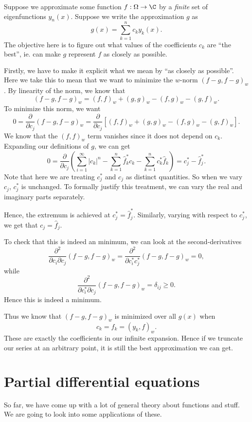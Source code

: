 \documentclass[a4paper]{article}
\begin{document}
Suppose we approximate some function $f: \Omega \to \C$ by a \emph{finite} set of eigenfunctions $y_n(x)$. Suppose we write the approximation $g$ as
\[
  g(x) = \sum_{k = 1}^n c_k y_k(x).
\]
The objective here is to figure out what values of the coefficients $c_k$ are ``the best'', ie. can make $g$ represent $f$ as closely as possible.

Firstly, we have to make it explicit what we mean by ``as closely as possible''. Here we take this to mean that we want to minimize the $w$-norm $(f - g, f - g)_w$. By linearity of the norm, we know that
\[
  (f - g, f - g)_w = (f, f)_w + (g, g)_w - (f, g)_w - (g, f)_w.
\]
To minimize this norm, we want
\[
  0 = \frac{\partial}{\partial c_j} (f - g, f - g)_w = \frac{\partial}{\partial c_j}[(f, f)_w + (g, g)_w - (f, g)_w - (g, f)_w].
\]
We know that the $(f, f)_w$ term vanishes since it does not depend on $c_k$. Expanding our definitions of $g$, we can get
\[
  0 = \frac{\partial}{\partial c_j}\left(\sum_{i = 1}^\infty |c_k|^n - \sum_{k = 1}^n \hat{f}_k^* c_k  - \sum_{k = 1}^n c_k^* \hat{f}_k\right) = c^*_j - \hat{f}_j^*.
\]
Note that here we are treating $c_j^*$ and $c_j$ as distinct quantities. So when we vary $c_j$, $c_j^*$ is unchanged. To formally justify this treatment, we can vary the real and imaginary parts separately.

Hence, the extremum is achieved at $c_j^* = \hat{f}_j^*$. Similarly, varying with respect to $c_j^*$, we get that $c_j = \hat{f}_j$.

To check that this is indeed an minimum, we can look at the second-derivatives
\[
  \frac{\partial^2}{\partial c_i \partial c_j} (f - g, f - g)_w = \frac{\partial^2}{\partial c_i^* c_j^*} (f - g, f - g)_w = 0,
\]
while
\[
  \frac{\partial^2}{\partial c_i^* \partial c_j} (f - g, f - g)_w = \delta_{ij} \geq 0.
\]
Hence this is indeed a minimum.

Thus we know that $(f - g, f - g)_w$ is minimized over all $g(x)$ when
\[
  c_k = \hat{f}_k = (y_k, f)_w.
\]
These are exactly the coefficients in our infinite expansion. Hence if we truncate our series at an arbitrary point, it is still the best approximation we can get.

\section{Partial differential equations}
So far, we have come up with a lot of general theory about functions and stuff. We are going to look into some applications of these.
\end{document}
